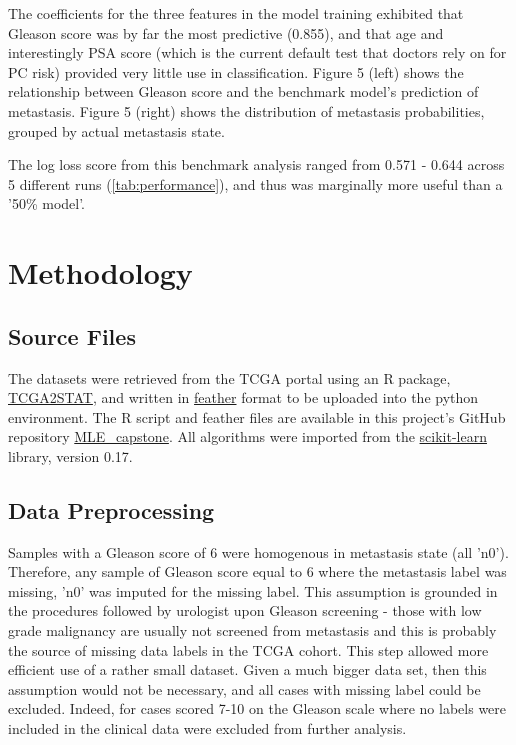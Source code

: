 \documentclass[final]{article}
\begin{document}
The coefficients for the three features in the model training exhibited that
Gleason score was by far the most predictive (0.855), and that age and
interestingly PSA score (which is the current default test that doctors rely on
for PC risk)  provided very little use in classification.  Figure 5
(left) shows the relationship between Gleason score and the benchmark model's
prediction of metastasis.  Figure 5 (right) shows the distribution of metastasis
probabilities, grouped by actual metastasis state.

The log loss score from this benchmark analysis ranged from 0.571 - 0.644 across 5 different runs (\ref{tab:performance}), and
thus was marginally more useful than a '50\% model'.

\section{Methodology}

\subsection{Source Files}

The datasets were retrieved from the TCGA portal using an R package,
\href{https://cran.r-project.org/web/packages/TCGA2STAT/index.html}{TCGA2STAT},
and written in \href{https://github.com/wesm/feather}{feather} format to be
uploaded into the python environment.  The R script and feather files are
available in this project's GitHub repository
\href{https://github.com/CCThompson82/MLE\_capstone}{MLE\_capstone}.  All
algorithms were imported from the
\href{http://scikit-learn.org/stable/}{scikit-learn} library, version 0.17.

\subsection{Data Preprocessing}

Samples with a Gleason score of 6 were homogenous in metastasis state (all
'n0'). Therefore, any sample of Gleason score equal to 6 where the metastasis
label was missing, 'n0' was imputed for the missing label.  This assumption is grounded
in the  procedures followed by urologist upon Gleason screening - those with low
grade  malignancy are usually not screened from metastasis and this is probably
the  source of missing data labels in the TCGA cohort.  This step allowed more
efficient use of a rather small dataset.  Given a much bigger data set, then
this assumption would not be necessary, and  all cases with missing label could
be excluded.  Indeed, for cases scored 7-10 on the Gleason scale where no labels
were included in the clinical data were excluded from further analysis.
\end{document}
